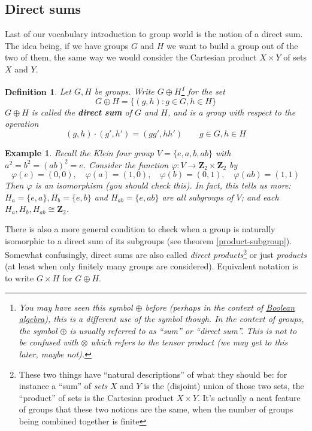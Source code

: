 \documentclass[12pt]{article}
\numberwithin{equation}{subsection}
\newtheorem{defn}[subsection]{Definition}
\theoremstyle{note}
\newtheorem{example}[subsection]{Example}
\begin{document}
\subsection{Direct sums}
Last of our vocabulary introduction to group world is the notion of a direct sum. The idea being, if we have groups $G$ and $H$ we want to build a group out of the two of them, the same way we would consider the Cartesian product $X\times Y$ of sets $X$ and $Y$.

\begin{defn}
	Let $G,H$ be groups. Write $G\oplus H$\footnote{You may have seen this symbol $\oplus$ before (perhaps in the context of \href{https://en.wikipedia.org/wiki/Boolean_algebra\#Secondary_operations}{Boolean algebra}), this is a different use of the symbol though. In the context of groups, the symbol $\oplus$ is usually referred to as ``sum'' or ``direct sum''. This is not to be confused with $\otimes$ which refers to the tensor product (we may get to this later, maybe not). } for the set \begin{equation}  G\oplus H =\{ (g,h) : g\in G, h\in H\} \end{equation} $G\oplus H$ is called the \textbf{direct sum} of $G$ and $H$, and is a group with respect to the operation \[ (g,h)\cdot (g',h')=(gg',hh') \qquad g\in G, h\in H\]
\end{defn}

\begin{example}\label{klein-four-group}
	Recall the Klein four group $V=\{e,a,b,ab\}$ with $a^2=b^2=(ab)^2=e$. Consider the function $\varphi \colon V\to \mathbf{Z}_2\times \mathbf{Z}_2$ by \[ \varphi(e)=(0,0), \quad \varphi(a)=(1,0), \quad \varphi(b)=(0,1), \quad \varphi(ab)=(1,1)\]
	Then $\varphi$ is an isomorphism (you should check this). In fact, this tells us more: $H_a=\{e,a\},H_b= \{e,b\}$ and $H_{ab}=\{e,ab\}$ are all subgroups of $V$; and each $H_a, H_b, H_{ab} \cong \mathbf{Z}_2$. 
\end{example}
There is also a more general condition to check when a group is naturally isomorphic to a direct sum of its subgroups (see theorem \ref{product-subgroup}). Somewhat confusingly, direct sums are also called \textit{direct products}\footnote{These two things have ``natural descriptions'' of what they should be: for instance a ``sum'' of \textit{sets} $X$ and $Y$ is the (disjoint) union of those two sets, the ``product'' of sets is the Cartesian product $X\times Y$. It's actually a neat feature of groups that these two notions are the same, when the number of groups being combined together is finite} or just \textit{products} (at least when only finitely many groups are considered). Equivalent notation is to write $G\times H$ for $G\oplus H$. 
\end{document}
